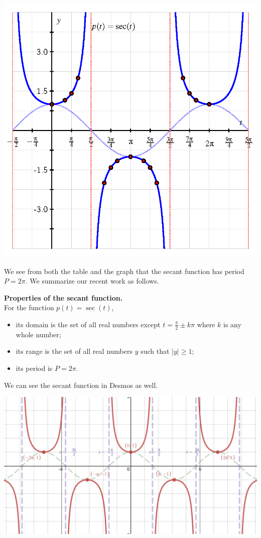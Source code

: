 \documentclass[nooutcomes, noauthor]{ximera}
\begin{document}
\begin{image}
\includegraphics{other-sec-definition-graph.png}
\end{image}

We see from both the table and the graph that the secant function has period \(P = 2\pi\).  We summarize our recent work as follows.

\begin{callout}
\textbf{Properties of the secant function.}\\
For the function \(p(t) = \sec(t)\),
\begin{itemize}[label=\textbullet]
\item
its domain is the set of all real numbers except \(t = \frac{\pi}{2} \pm k\pi\) where \(k\) is any whole number;%
\item
its range is the set of all real numbers \(y\) such that \(|y| \ge 1\);%
\item
its period is \(P = 2\pi\).%
\end{itemize}
\end{callout}

We can see the secant function in Desmos as well.  

\begin{image}
\includegraphics[width=\textwidth]{secant.jpg}
\end{image}
\end{document}
